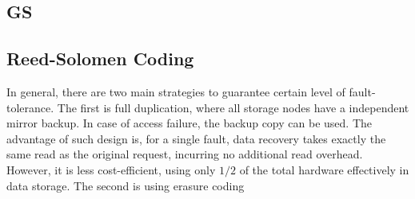 \subsection{GS}

\subsection{Reed-Solomen Coding}

In general, there are two main strategies to guarantee certain level of fault-tolerance. The first is full duplication, where all storage nodes have a independent mirror backup. In case of access failure, the backup copy can be used. The advantage of such design is, for a single fault, data recovery takes exactly the same read as the original request, incurring no additional read overhead. However, it is less cost-efficient, using only $1/2$ of the total hardware effectively in data storage. The second is using erasure coding